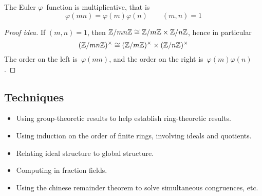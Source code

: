\begin{cor}
The Euler \(\varphi\)~function is multiplicative, that is
\[\varphi(mn)=\varphi(m)\varphi(n)\qquad(m,n)=1\]
\end{cor}
\begin{proof}[Proof idea]
If \((m,n)=1\), then \(\mathbb{Z}/mn\mathbb{Z}\cong\mathbb{Z}/m\mathbb{Z}\times\mathbb{Z}/n\mathbb{Z}\), hence in particular
\[(\mathbb{Z}/mn\mathbb{Z})^{\times}\cong(\mathbb{Z}/m\mathbb{Z})^{\times}\times(\mathbb{Z}/n\mathbb{Z})^{\times}\]
The order on the left is~\(\varphi(mn)\), and the order on the right is~\(\varphi(m)\varphi(n)\).
\end{proof}

\subsection*{Techniques}
\begin{itemize}[itemsep=0pt]
\item Using group-theoretic results to help establish ring-theoretic results.
\item Using induction on the order of finite rings, involving ideals and quotients.
\item Relating ideal structure to global structure.
\item Computing in fraction fields.
\item Using the chinese remainder theorem to solve simultaneous congruences, etc.
\end{itemize}
